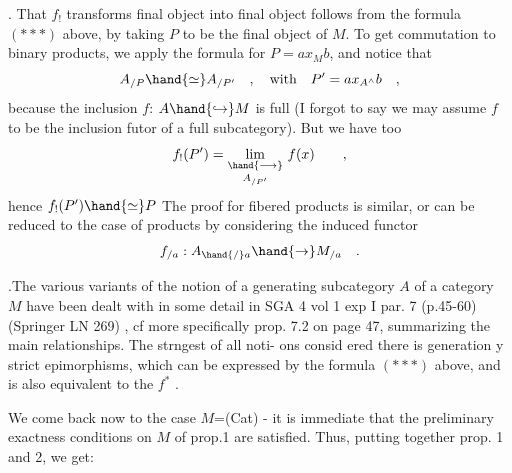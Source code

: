 
 \hand{\uline{\textcolor{black}{Proof}}}. That $f_{!}$ transforms final object into final object follows
from the formula $(* * *)$ above, by taking $P$ to be the final object of $M$.
To get commutation to binary products, we apply the formula for $P=ax_{M}b$,
and notice that
\[ A_{/P} \hand{\simeq} A_{/P'} \quad , \quad \text{with} \quad P' = ax_{A^{\wedge}}b \quad , \]
because the inclusion $f$: $A \hand{\hookrightarrow} M$ is full (I forgot to say we may assume $f$
to be the inclusion futor of a full subcategory). But we have too
\[ f_{!}(P') = \underset{A_{/P'}}{\underset{\hand{\longrightarrow}}{\mathrm{lim}}}\ f(x) \qquad , \]
hence $f_{!}(P') \hand{\simeq} P$ \hand{,}  The proof for fibered products is similar, or
can be reduced to the case of products by considering the induced functor
\[ f_{/a} : A_{\hand{/}a} \hand{\to} M_{/a} \quad . \]

\hand{\uline{\textcolor{black}{Remark}}}.The various variants of the notion of a generating subcategory $A$
of a category $M$ have been dealt with in some detail in SGA 4 vol 1 exp I
par. 7 (p.45-60) (Springer LN 269) , cf more specifically prop. 7.2 on
page 47, summarizing the main relationships. The strngest of all noti-%
ons consid ered there is generation y strict epimorphisms, which can be
expressed by the formula $(* * *)$ above, and is also equivalent to the
\hand{\uline{\textcolor{black}{functor}}} $f^{*}$ \hand{\uline{\textcolor{black}{being fully faithful}}} .

We come back now to the case $M$=(Cat) - it is immediate that the
preliminary exactness conditions on $M$ of prop.1 are satisfied. Thus,
putting together prop. 1 and 2, we get:

